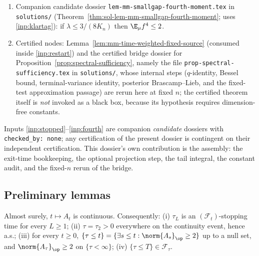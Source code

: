 \documentclass[../main.tex]{subfiles}
\begin{document}
\begin{enumerate}[label=(I\arabic*),leftmargin=2.8em]
  uniqueness.
  \item\label{inp:fourth} Companion candidate dossier
  \texttt{lem-mm-smallgap-fourth-moment.tex} in \texttt{solutions/}
  (Theorem~\ref{thm:sol-lem-mm-smallgap-fourth-moment}; uses \ref{inp:klartag}): if
  $\lambda\le3/(8K_n)$ then $\E_\mu f^4\le2$.
  \item\label{inp:certified} Certified nodes:
  Lemma~\ref{lem:mm-time-weighted-fixed-source} (consumed inside \ref{inp:restart})
  and the certified bridge dossier for
  Proposition~\ref{prop:spectral-sufficiency}, namely the file
  \texttt{prop-spectral-\allowbreak sufficiency.tex} in \texttt{solutions/},
  whose internal steps ($q$-identity,
  Bessel bound, terminal-variance identity, posterior Brascamp--Lieb, and the
  fixed-test approximation passage) are rerun here at fixed $n$; the certified theorem
  itself is \emph{not} invoked as a black box, because its hypothesis requires
  dimension-free constants.
\end{enumerate}
Inputs \ref{inp:stopped}--\ref{inp:fourth} are companion \emph{candidate} dossiers with
\texttt{checked\_by: none}; any certification of the present dossier is contingent on
their independent certification.  This dossier's own contribution is the assembly:
the exit-time bookkeeping, the optional projection step, the tail integral, the
constant audit, and the fixed-$n$ rerun of the bridge.

\subsection*{Preliminary lemmas}

\begin{lemma}
\label{lem:sol-mwo-exit}
Almost surely, $t\mapsto A_t$ is continuous.  Consequently: \textup{(i)} $\tau_L$ is an
$(\mathcal F_t)$-stopping time for every $L\ge1$; \textup{(ii)} $\tau=\tau_2>0$
everywhere on the continuity event, hence a.s.; \textup{(iii)} for every $t\ge0$,
$\{\tau\le t\}=\{\exists s\le t:\norm{A_s}_\op\ge2\}$ up to a null set, and
$\norm{A_\tau}_\op\ge2$ on $\{\tau<\infty\}$; \textup{(iv)}
$\{\tau\le T\}\in\mathcal F_\tau$.
\end{lemma}
\end{document}
